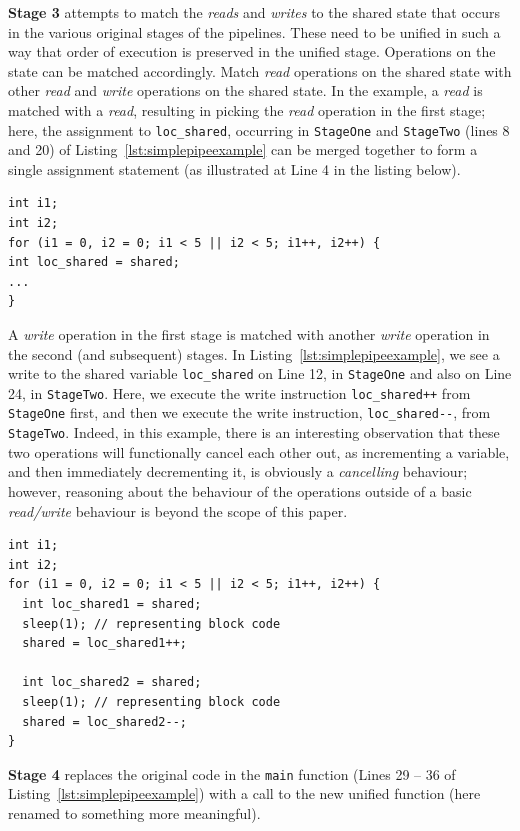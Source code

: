 \textbf{Stage 3} attempts to match the \emph{reads} and \emph{writes} to the shared state that occurs in the various original stages of the pipelines. These need to be unified in such a way that order of execution is preserved in the unified stage. Operations on the state can be matched accordingly. Match \emph{read} operations on the shared state with other \emph{read} and \emph{write} operations on the shared state. In the example, a \emph{read} is matched with a \emph{read}, resulting in picking the \emph{read} operation in the first stage; here, the assignment to \lstinline|loc_shared|, occurring in \lstinline|StageOne| and \lstinline|StageTwo| (lines 8 and 20) of Listing~\ref{lst:simplepipeexample} can be merged together to form a single assignment statement (as illustrated at Line 4 in the listing below).
\begin{lstlisting}[frame=single]
int i1;
int i2;
for (i1 = 0, i2 = 0; i1 < 5 || i2 < 5; i1++, i2++) {
int loc_shared = shared;
...
}
\end{lstlisting}

A \emph{write} operation in the first stage is matched with another \emph{write} operation in the second (and subsequent) stages. In Listing~\ref{lst:simplepipeexample}, we see a write to the shared variable \lstinline|loc_shared| on Line 12, in \lstinline|StageOne| and also on Line 24, in \lstinline|StageTwo|. Here, we execute the write instruction \lstinline|loc_shared++| from \lstinline|StageOne| first, and then we execute the write instruction, \lstinline|loc_shared--|, from \lstinline|StageTwo|. Indeed, in this example, there is an interesting observation that these two operations will functionally cancel each other out, as incrementing a variable, and then immediately decrementing it, is obviously a \emph{cancelling} behaviour; however, reasoning about the behaviour of the operations outside of a basic \emph{read/write} behaviour is beyond the scope of this paper.

  \begin{lstlisting}[frame=single]
int i1;
int i2;
for (i1 = 0, i2 = 0; i1 < 5 || i2 < 5; i1++, i2++) {
  int loc_shared1 = shared;
  sleep(1); // representing block code
  shared = loc_shared1++;

  int loc_shared2 = shared;
  sleep(1); // representing block code
  shared = loc_shared2--;
}
\end{lstlisting}


\textbf{Stage 4} replaces the original code in the \lstinline{main} function (Lines 29 -- 36 of Listing~\ref{lst:simplepipeexample}) with a call to the new unified function (here renamed to something more meaningful).

